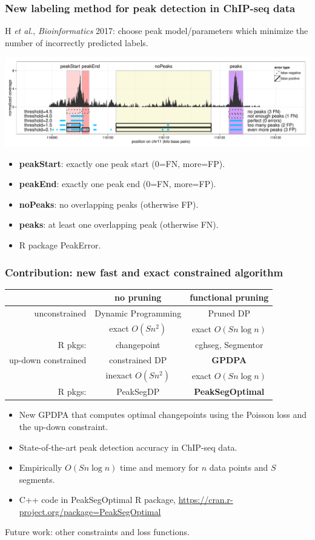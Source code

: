 \documentclass{beamer}
\begin{document}
\begin{frame}
  \frametitle{New labeling method for peak detection in ChIP-seq data}

  H {\it et al.}, {\it Bioinformatics} 2017: choose peak model/parameters
  which minimize the number of incorrectly predicted labels.

  \includegraphics[width=\textwidth]{figure-PeakError.pdf}
  \begin{itemize}
  \item \textbf{peakStart}: exactly one peak start (0=FN, more=FP).
  \item \textbf{peakEnd}: exactly one peak end (0=FN, more=FP).
  \item \textbf{noPeaks}: no overlapping peaks (otherwise FP).
  \item \textbf{peaks}: at least one overlapping peak (otherwise FN).
  \item R package PeakError.
  \end{itemize}
\end{frame}


\begin{frame}
  \frametitle{Contribution: new fast and exact constrained algorithm}
  \begin{tabular}{r|c|c}
    & no pruning & functional pruning \\
    \hline
    unconstrained & Dynamic Programming & Pruned DP \\
     & exact $O(S n^2)$ & exact $O(Sn\log n)$\\
    R pkgs: & changepoint & cghseg, Segmentor\\
    \hline
    up-down constrained & constrained DP & \textbf{GPDPA} \\
     & inexact $O(Sn^2)$ & exact $O(Sn\log n)$\\
    R pkgs: & PeakSegDP & \textbf{PeakSegOptimal}\\
    \hline 
  \end{tabular}
  \begin{itemize}
  \item New GPDPA that computes optimal changepoints 
    using the Poisson loss and the up-down constraint.
  \item State-of-the-art peak detection accuracy in ChIP-seq data.
  \item Empirically $O(S n \log n)$ time and memory for $n$ data
    points and $S$ segments.
  \item C++ code in PeakSegOptimal R package, 
    \url{https://cran.r-project.org/package=PeakSegOptimal}
  \end{itemize}
  Future work: other constraints and loss functions.
\end{frame}
\end{document}
